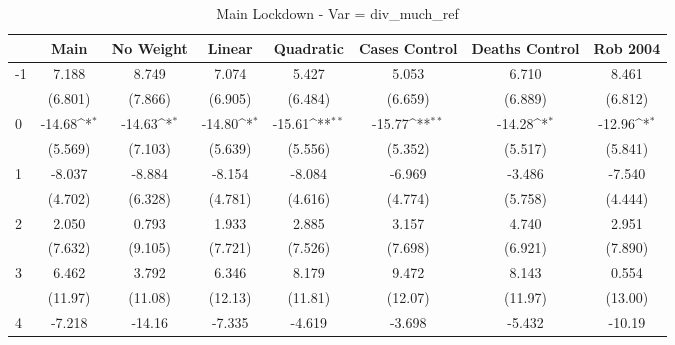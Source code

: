 \documentclass{article}
\begin{document}
{
\def\sym#1{\ifmmode^{#1}\else\(^{#1}\)\fi}
\begin{longtable}{l*{7}{c}}
\caption{Main Lockdown - Var = div\_much\_ref}\\
\hline\hline\endfirsthead\hline\endhead\hline\endfoot\endlastfoot
                &\multicolumn{1}{c}{Main}&\multicolumn{1}{c}{No Weight}&\multicolumn{1}{c}{Linear}&\multicolumn{1}{c}{Quadratic}&\multicolumn{1}{c}{Cases Control}&\multicolumn{1}{c}{Deaths Control}&\multicolumn{1}{c}{Rob 2004}\\
\hline
-1              &    7.188         &    8.749         &    7.074         &    5.427         &    5.053         &    6.710         &    8.461         \\
                &  (6.801)         &  (7.866)         &  (6.905)         &  (6.484)         &  (6.659)         &  (6.889)         &  (6.812)         \\
0               &   -14.68\sym{*}  &   -14.63\sym{*}  &   -14.80\sym{*}  &   -15.61\sym{**} &   -15.77\sym{**} &   -14.28\sym{*}  &   -12.96\sym{*}  \\
                &  (5.569)         &  (7.103)         &  (5.639)         &  (5.556)         &  (5.352)         &  (5.517)         &  (5.841)         \\
1               &   -8.037         &   -8.884         &   -8.154         &   -8.084         &   -6.969         &   -3.486         &   -7.540         \\
                &  (4.702)         &  (6.328)         &  (4.781)         &  (4.616)         &  (4.774)         &  (5.758)         &  (4.444)         \\
2               &    2.050         &    0.793         &    1.933         &    2.885         &    3.157         &    4.740         &    2.951         \\
                &  (7.632)         &  (9.105)         &  (7.721)         &  (7.526)         &  (7.698)         &  (6.921)         &  (7.890)         \\
3               &    6.462         &    3.792         &    6.346         &    8.179         &    9.472         &    8.143         &    0.554         \\
                &  (11.97)         &  (11.08)         &  (12.13)         &  (11.81)         &  (12.07)         &  (11.97)         &  (13.00)         \\
4               &   -7.218         &   -14.16         &   -7.335         &   -4.619         &   -3.698         &   -5.432         &   -10.19         \\

\end{longtable}}
\end{document}
